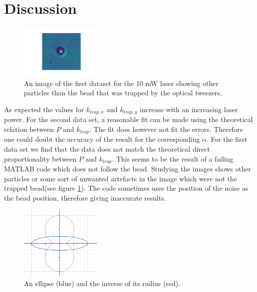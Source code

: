 \section{Discussion}

\begin{figure}
    \centering
    \includegraphics[width=0.35\textwidth,keepaspectratio]{figures/single_frame.jpg}
    \caption{An image of the first dataset for the 10 mW laser showing other particles than the bead that was trapped by the optical tweezers.}
    \label{fig_frame}
\end{figure}

As expected the values for $k_{trap,x}$ and $k_{trap,y}$ increase with an increasing laser power. For the second data set, a reasonable fit can be made using the theoretical relation between $P$ and $k_{trap}$. The fit does however not fit the errors. Therefore one could doubt the accuracy of the result for the corresponding $\alpha$. For the first data set we find that the data does not match the theoretical direct proportionality between $P$ and $k_{trap}$. This seems to be the result of a failing MATLAB code which does not follow the bead. Studying the images shows  other particles or some sort of unwanted artefacts in the image which were not the trapped bead(see figure \ref{fig_frame}). The code sometimes uses the position of the noise as the bead position, therefore giving inaccurate results.
\begin{figure}
    \centering
    \includegraphics[width=0.35\textwidth,keepaspectratio]{figures/ellipse_inverse.png}
    \caption{An ellipse (blue) and the inverse of its radius (red).}
    \label{fig_ellipse_inverse}
\end{figure}

